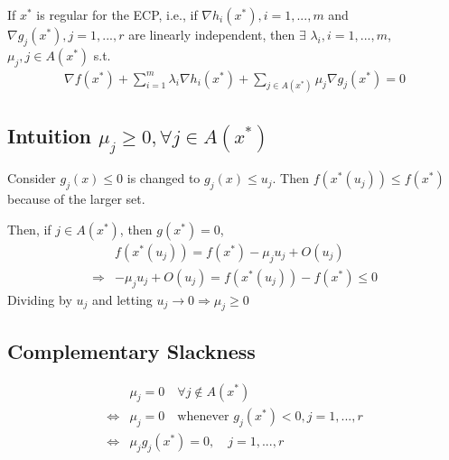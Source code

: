 \documentclass[11pt,a4paper]{article}
\begin{document}
If $x^*$ is regular for the ECP, i.e., if $\nabla h_i(x^*),i=1,...,m$ and $\nabla g_j(x^*),j=1,...,r$ are linearly independent, then $\exists$ $\lambda_i,i=1,...,m$, $\mu_j,j\in A(x^*)$ s.t.
\begin{equation}
    \begin{aligned}
        \nabla f(x^*)+\sum_{i=1}^m\lambda_i \nabla h_i(x^*)+\sum_{j\in A(x^*)}\mu_j \nabla g_j(x^*)=0
    \end{aligned}
    \nonumber
\end{equation}

\subsection{Intuition $\mu_j\geq 0, \forall j\in A(x^*)$}
Consider $g_j(x)\leq 0$ is changed to $g_j(x)\leq u_j$. Then $f(x^*(u_j))\leq f(x^*)$ because of the larger set.

Then, if $j\in A(x^*)$, then $g(x^*)=0$,
\begin{equation}
    \begin{aligned}
        &f(x^*(u_j))=f(x^*)-\mu_ju_j+O(u_j)\\
        \Rightarrow	& -\mu_j u_j+O(u_j)=f(x^*(u_j))-f(x^*)\leq 0
    \end{aligned}
    \nonumber
\end{equation}
Dividing by $u_j$ and letting $u_j \rightarrow 0 \Rightarrow \mu_j\geq 0$

\subsection{Complementary Slackness}
\begin{equation}
    \begin{aligned}
        &\mu_j=0\quad \forall j\notin A(x^*)\\
        \Leftrightarrow & \mu_j=0\quad \text{whenever }g_j(x^*)<0, j=1,...,r\\
        \Leftrightarrow & \mu_jg_j(x^*)=0,\quad j=1,...,r
    \end{aligned}
    \nonumber
\end{equation}
\end{document}
